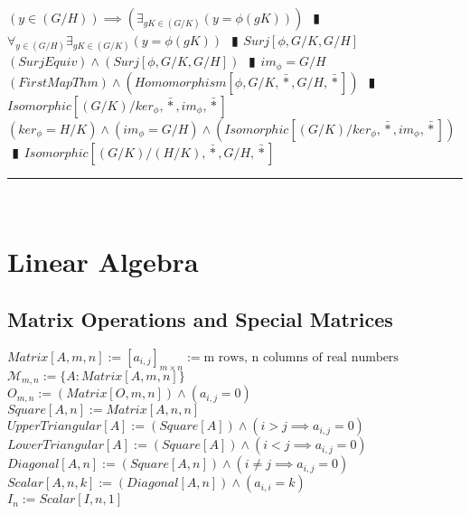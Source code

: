 \documentclass{book}
\newcommand{\abr}{:=}
\newcommand{\pipe}{$\phantom{(}\vrectangleblack\phantom{)}$}
\newcommand{\bbin}[1]{\mathbin{{\bar{#1}}}}
\begin{document}
\begin{enumerate}
\begin{enumerate}
  \end{enumerate}
  \lit $(y \in (G / H)) \implies (\exists_{g K \in (G / K)}(y = \phi(g K)))$ \pipe $\forall_{y \in (G / H)} \exists_{g K \in (G / K)}(y = \phi(g K))$ \pipe $Surj[\phi, G / K, G / H]$
  \lit $(SurjEquiv) \land (Surj[\phi, G / K, G / H])$ \pipe $im_\phi = G / H$
  \lit $(FirstMapThm) \land (Homomorphism[\phi, G / K, \bbin{*}, G / H, \bbin{*}])$ \pipe $Isomorphic[(G / K) / ker_\phi, \bbin{*}, im_\phi, \bbin{*}]$
  \lit $(ker_\phi = H / K) \land (im_\phi = G / H) \land (Isomorphic[(G / K) / ker_\phi, \bbin{*}, im_\phi, \bbin{*}])$ \pipe $Isomorphic[(G / K) / (H / K), \bbin{*}, G / H, \bbin{*}]$
\end{enumerate} \vspace{.75mm} \hrule \vspace{.75mm} \ \\ 

%
% 
\chapter{Linear Algebra} %

\section{Matrix Operations and Special Matrices}
$Matrix[A, m, n] \abr [a_{i, j}]_{m \times n} \abr \text{m rows, n columns of real numbers}$ \\
$\mathcal{M}_{m, n} \abr \{A : Matrix[A, m, n]\}$ \\
$O_{m, n} \abr (Matrix[O, m, n]) \land (a_{i, j} = 0)$ \\
$Square[A, n] \abr Matrix[A, n, n]$ \\
$UpperTriangular[A] \abr (Square[A]) \land (i > j \implies a_{i, j} = 0)$ \\
$LowerTriangular[A] \abr (Square[A]) \land (i < j \implies a_{i, j} = 0)$ \\
$Diagonal[A, n] \abr (Square[A, n]) \land (i \neq j \implies a_{i, j} = 0)$ \\
$Scalar[A, n, k] \abr (Diagonal[A, n]) \land (a_{i, i} = k)$ \\
$I_n \abr Scalar[I, n, 1]$ \\
\end{document}
